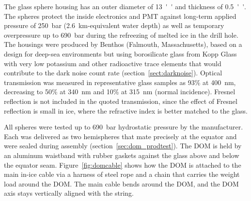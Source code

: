 The glass sphere housing has an outer diameter of \SI{13}{''} and thickness
of \SI{0.5}{''}.
The spheres protect the inside electronics and PMT against long-term applied pressure of 
\qty{250}{bar} (\qty{2.6}{km}-equivalent water depth)
as well as temporary overpressure up to \qty{690}{bar} during the refreezing of melted ice in the drill hole.
The housings were produced by Benthos (Falmouth, Massachusetts), based on a design for deep-sea
environments but using borosilicate glass from Kopp Glass
with very low potassium and other radioactive trace elements that would contribute to the dark noise
count rate (section~\ref{sect:darknoise}).  
Optical transmission was measured in representative glass samples as 93\% at \qty{400}{nm},
decreasing to 50\% at \qty{340}{nm} and 10\% at \qty{315}{nm} (normal
incidence). Fresnel reflection is not included in the quoted
transmission, since the effect of Fresnel reflection is small in ice,
where the refractive index is better matched to the glass.

All spheres were tested up to \qty{690}{bar} hydrostatic pressure by the manufacturer.
Each was delivered as two hemispheres that mate precisely at the equator
and were sealed during assembly (section~\ref{sec:dom_prodtest}).  The DOM
is held by an aluminum waistband with rubber gaskets against 
the glass above and below the equator seam. 
Figure~\ref{fig:domcable} shows how the DOM is attached to the main in-ice cable via a harness
of steel rope and a chain that carries the weight load around the DOM.
The main cable bends around the DOM, and the DOM axis stays vertically aligned with the string.

